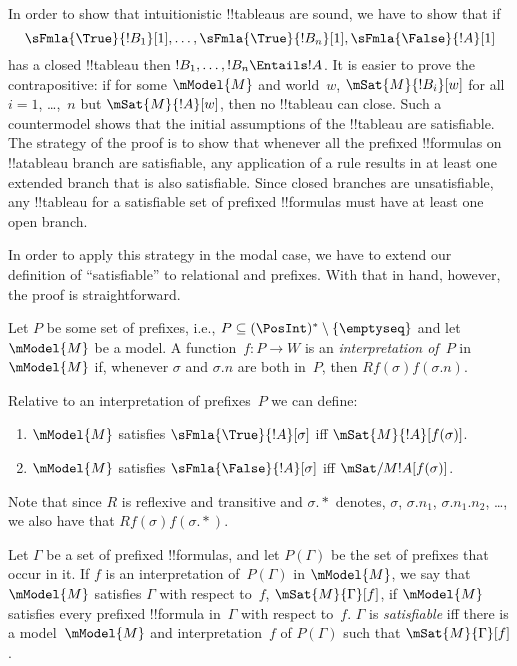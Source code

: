 \documentclass[../../../include/open-logic-section]{subfiles}
\begin{document}


\begin{explain}
  In order to show that intuitionistic !!{tableau}s are sound, we have to
  show that if
  \[
  \sFmla{\True}{!B_1}[1], \dots, \sFmla{\True}{!B_n}[1], \sFmla{\False}{!A}[1]
  \]
  has a closed !!{tableau} then $!B_1, \dots, !B_n \Entails !A$. It is
  easier to prove the contrapositive: if for some $\mModel{M}$ and
  world~$w$, $\mSat{M}{!B_i}[w]$ for all $i=1$, \dots,~$n$ but
  $\mSat{M}{!A}[w]$, then no !!{tableau} can close. Such a
  countermodel shows that the initial assumptions of the !!{tableau}
  are satisfiable. The strategy of the proof is to show that whenever
  all the prefixed !!{formula}s on !!a{tableau} branch are
  satisfiable, any application of a rule results in at least one
  extended branch that is also satisfiable. Since closed branches are
  unsatisfiable, any !!{tableau} for a satisfiable set of prefixed
  !!{formula}s must have at least one open branch.

  In order to apply this strategy in the modal case, we have to extend
  our definition of ``satisfiable'' to relational and prefixes. With
  that in hand, however, the proof is straightforward.
\end{explain}

\begin{defn}
  Let $P$ be some set of prefixes, i.e., $P \subseteq (\PosInt)^*
  \setminus \{\emptyseq\}$ and let $\mModel{M}$ be a model.  A
  function~$f\colon P \to W$ is an \emph{interpretation of}~$P$
  in~$\mModel{M}$ if, whenever $\sigma$ and $\sigma.n$ are both
  in~$P$, then $Rf(\sigma)f(\sigma.n)$.

  Relative to an interpretation of prefixes~$P$ we can define:
  \begin{enumerate}
  \item $\mModel{M}$ satisfies $\sFmla{\True}{!A}[\sigma]$ iff
    $\mSat{M}{!A}[f(\sigma)]$.
  \item $\mModel{M}$ satisfies $\sFmla{\False}{!A}[\sigma]$ iff
    $\mSat/{M}{!A}[f(\sigma)]$.
  \end{enumerate}
\end{defn}

Note that since $R$ is reflexive and transitive and $\sigma.{*}$
denotes, $\sigma$, $\sigma.n_1$, $\sigma.n_1.n_2$, \dots, we also have
that $Rf(\sigma)f(\sigma.{*})$. 

\begin{defn}
  Let $\Gamma$ be a set of prefixed !!{formula}s, and let $P(\Gamma)$
  be the set of prefixes that occur in it. If $f$ is an interpretation
  of~$P(\Gamma)$ in $\mModel{M}$, we say that $\mModel{M}$ satisfies
  $\Gamma$ with respect to~$f$, $\mSat{M}{\Gamma}[f]$, if $\mModel{M}$
  satisfies every prefixed !!{formula} in~$\Gamma$ with respect
  to~$f$. $\Gamma$ is \emph{satisfiable} iff there is a
  model~$\mModel{M}$ and interpretation~$f$ of $P(\Gamma)$ such that
  $\mSat{M}{\Gamma}[f]$.
\end{defn}
\end{document}
